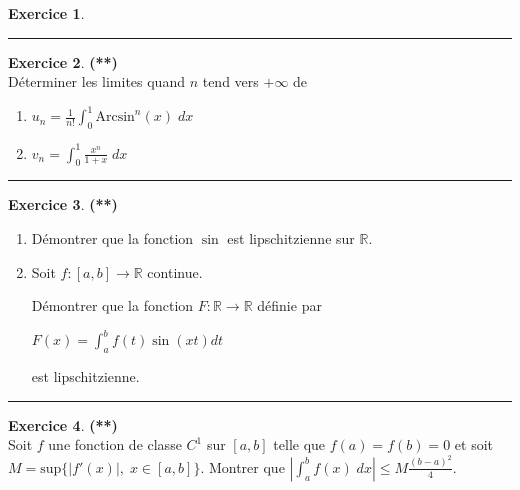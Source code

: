 \documentclass[a4paper,11pt]{article}
\theoremstyle{definition}
\newtheorem{exo}{Exercice} %
\begin{document}
\begin{minipage}{1\linewidth}
\begin{minipage}[t]{0.48\linewidth}
\begin{exo}
	\centering\rule{1\linewidth}{0.6pt}\end{exo}


\begin{exo}\textbf{(**)}\quad\\[0.2cm]
	Déterminer les limites quand $n$ tend vers $+\infty$ de
	\begin{enumerate}
		\item $u_n = \displaystyle\frac{1}{n!}\int_{0}^{1}\text{Arcsin}^n(x)\;dx$
		\item $v_n = \displaystyle\int_{0}^{1}\frac{x^n}{1+x}\;dx$
		
	\end{enumerate}
	

	
	\centering\rule{1\linewidth}{0.6pt}\end{exo}


\begin{exo}\textbf{(**)}\quad\\[0.2cm]
	\begin{enumerate}
		\item Démontrer que la fonction $\sin$ est lipschitzienne sur $\mathbb R$.
		\item Soit $f:[a,b]\to\mathbb R$ continue. 
		
		Démontrer que la fonction $F:\mathbb R\to\mathbb R$ définie par 
		
		\centering$F(x)=\displaystyle\int_a^b f(t)\sin(xt)dt$\\
		
		
		\raggedright
		est lipschitzienne.
	\end{enumerate}	
	
	
	\centering\rule{1\linewidth}{0.6pt}\end{exo}




\end{minipage}\hfill\vrule\hfill\begin{minipage}[t]{0.48\linewidth}\raggedright

\begin{exo}\textbf{(**)}\quad\\[0.2cm]
	Soit $f$ une fonction de classe $C^1$ sur $[a,b]$ telle que $f(a)=f(b)=0$ et soit $\displaystyle M=\mbox{sup}\{|f '(x)|,\;x\in[a,b]\}$. Montrer que $\displaystyle\left|\int_{a}^{b}f(x)\;dx\right|\leq M\frac{(b-a)^2}{4}$. 	
	

\end{exo}
\end{minipage}
\end{minipage}
\end{document}
